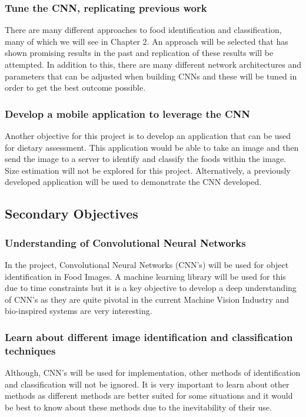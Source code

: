 \subsubsection*{Tune the CNN, replicating previous work}
There are many different approaches to food identification and classification,
many of which we will see in Chapter 2. An approach will be selected that has
shown promising results in the past and replication of these results will be attempted. In addition to this, there are many different network architectures and parameters that can be adjusted when building CNNs and these will be tuned in order to get the best outcome possible.

\subsubsection*{Develop a mobile application to leverage the CNN}
Another objective for this project is to develop an application that can be used
for dietary assessment. This application would be able to take an image and then send the image to a server to identify and classify the foods within the image. Size estimation will not be explored for this project. Alternatively, a previously developed application will be used to demonstrate the CNN developed.

\subsection*{Secondary Objectives}
\subsubsection*{Understanding of Convolutional Neural Networks}
In the project, Convolutional Neural Networks (CNN's) will be used for object identification in Food Images.
A machine learning library will be used for this due to time constraints but it is a key
objective to develop a deep understanding of CNN's as they are quite pivotal in the current Machine Vision Industry and bio-inspired systems are very interesting.

\subsubsection*{Learn about different image identification and classification techniques}
Although, CNN's will be used for implementation, other methods of identification and classification will not be ignored.
It is very important to learn about other methods as different methods
are better suited for some situations and it would be best to know about these methods due to the inevitability of their use.

